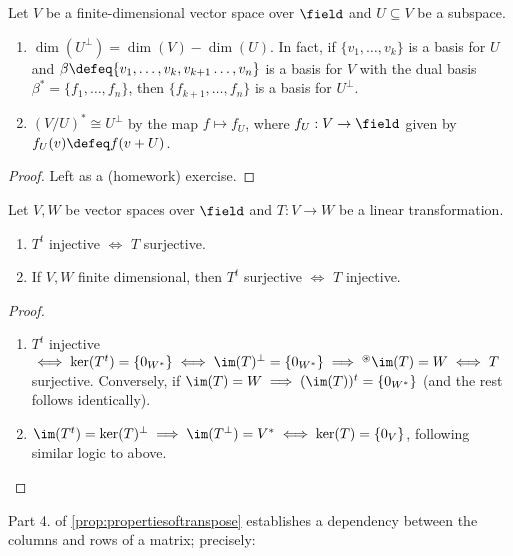 \begin{theorem}
    Let $V$ be a finite-dimensional vector space over $\field$ and $U \subseteq V$ be a subspace. \begin{enumerate}
        \item $\dim(U^\perp) = \dim(V) - \dim(U)$. In fact, if $\{v_1, \dots, v_k\}$ is a basis for $U$ and $\beta \defeq \{v_1, \dots, v_k, v_{k+1} \dots, v_n\}$ is a basis for $V$ with the dual basis $\beta^\ast = \{f_1, \dots, f_n\}$, then $\{f_{k+1}, \dots, f_n\}$ is a basis for $U^\perp$.
        \item $(V/U)^\ast \cong U^\perp$ by the map $f \mapsto f_U$, where $f_U:V \to \field$ given by $f_U(v) \defeq f(v + U)$.
    \end{enumerate}
\end{theorem}
\begin{proof}
    Left as a (homework) exercise.



\end{proof}

\begin{corollary}
    Let $V, W$ be vector spaces over $\field$ and $T: V \to W$ be a linear transformation.
    \begin{enumerate}
        \item $T^t$ injective $\iff$ $T$ surjective.
        \item If $V, W$ finite dimensional, then $T^t$ surjective $\iff$ $T$ injective.
    \end{enumerate}
\end{corollary}

\begin{proof}
    \begin{enumerate}
        \item $T^t$ injective $\iff \ker(T^t) = \{0_{W^\ast}\} \iff \im(T)^\perp = \{0_{W^\ast}\}\implies^{\circledast}\im(T) = W \iff T$ surjective. Conversely, if $\im(T) = W \implies (\im(T))^t = \{0_{W^\ast}\}$ (and the rest follows identically).
        \item $\im(T^t) = \ker(T)^\perp \implies \im(T^\perp) = V^\ast \iff \ker(T) = \{0_V\}$, following similar logic to above.
    \end{enumerate}
\end{proof}

\begin{remark}
    Part 4. of \cref{prop:propertiesoftranspose} establishes a dependency between the columns and rows of a matrix; precisely:
\end{remark}
